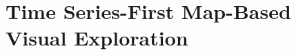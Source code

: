 \section{Time Series-First Map-Based Visual Exploration}\label{chap:4_2}

\graphicspath{{ElsevierBigDataResearch/}}







